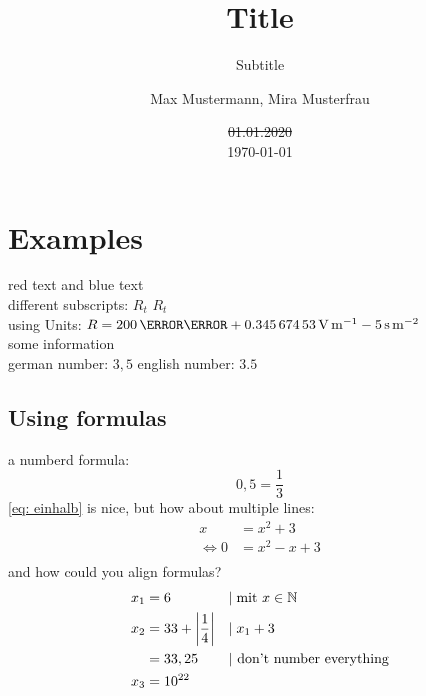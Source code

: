 \documentclass[	%
		fontsize=11pt,  %
		a4paper,	    %
		twoside,		%
		english,		%
		sans,			%
		f1,				%
	]{HsH-report}		%
\author{
	Max Mustermann,
	Mira Musterfrau
}
\title{Title}
\subtitle{Subtitle}
\date{\st{01.01.2020}\\\today}
\begin{document}

\maketitle[c]
\declarationAuthorship

\begin{abstract}
	\lipsum[5-8]
\end{abstract}

\tableofcontents

\cleardoublepage %

\chapter{Examples}
	\label{chap: one}
	{\color{red}red text} and {\color{blue}blue text} \\
	different subscripts: \normalsubscripts$R_t$ \upsubscripts$R_t$ \\
	using Units: $R=200\,\milli\ohm + \SI{0.34567453}{\volt\per\metre} - 5\,\si{\second\per\metre\squared}$ \\
	some information\cite{laboranleitung:physik}\\
	german number: $3,5$ english number: $3.5$\\ %


	\section{Using formulas}
		\label{sec: formula}
		a numberd formula:
		\begin{equation}
			\label{eq: einhalb} %
			0,5=\frac{1}{3}
		\end{equation}
		\autoref{eq: einhalb} is nice, but how about multiple lines:
		\begin{equation}
		\begin{split} %
			x &= x^2+3 \\
			\Leftrightarrow 0 &= x^2-x+3 \\
		\end{split}
		\end{equation}
		and how could you align formulas?
		\begin{align}
			x_1 &= 6 &&|\;\mbox{mit } x \in \mathbb{N} \\
			x_2 &= 33+\left\vert\frac{1}{4}\right\vert &&|\;x_1+3 \\
				&= 33,25 &&\mbox{| don't number everything} \notag \\
			x_3 &= 10^{22}
		\end{align}
\end{document}
